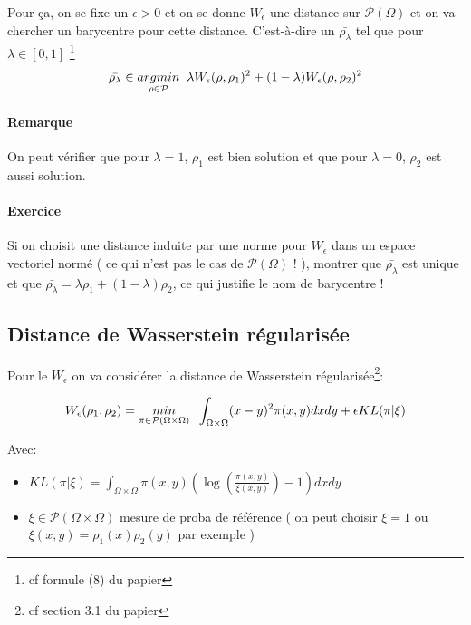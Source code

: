 \documentclass[11pt]{article}
\begin{document}
    Pour ça, on se fixe un $\epsilon > 0$ et on se donne $W_\epsilon$ une distance sur $\mathcal{P}(\Omega)$ et on va chercher un barycentre pour cette distance. C'est-à-dire un  $\bar{\rho_\lambda}$ tel que pour $\lambda \in [0,1]$ \footnote{cf formule (8) du papier}
    \begin{equation}
    \bar{\rho_\lambda} \in \underset{\rho \in \mathcal{P}}{argmin} \hspace{0.2cm} \lambda W_\epsilon(\rho, \rho_1)^2 + (1-\lambda) W_\epsilon(\rho, \rho_2)^2
    \end{equation}
    
    \paragraph{Remarque}
     On peut vérifier que pour $\lambda=1$, $\rho_1$ est bien solution et que pour $\lambda=0$, $\rho_2$ est aussi solution.
    
    \paragraph{Exercice}
    Si on choisit une distance induite par une norme pour $W_\epsilon$ dans un espace vectoriel normé ( ce qui n'est pas le cas de $\mathcal{P}(\Omega)$ ! ), montrer que $\bar{\rho_\lambda}$ est unique et que $\bar{\rho_\lambda} = \lambda \rho_1 + (1-\lambda) \rho_2$, ce qui justifie le nom de barycentre !
    
    \newpage
    \subsection{Distance de Wasserstein régularisée}
    
    Pour le $W_\epsilon$ on va considérer la distance de Wasserstein régularisée\footnote{cf section 3.1 du papier}:
    
    \begin{equation}
    W_\epsilon(\rho_1, \rho_2) = \underset{\pi \in \mathcal{P}(\Omega \times \Omega )}{min} \hspace{0.2cm} \int_{\Omega \times \Omega} (x-y)^2 \pi(x,y) dx dy + \epsilon KL(\pi | \xi )
    \end{equation}
    
    Avec:
    \begin{itemize}
    \item $KL(\pi | \xi ) = \int_{\Omega \times \Omega} \pi(x,y) (\log (\frac{\pi(x,y)}{\xi(x,y)}) -1) dx dy$
    \item $\xi \in \mathcal{P}(\Omega \times \Omega )$ mesure de proba de référence ( on peut choisir $\xi=1$ ou $\xi(x,y)= \rho_1(x) \rho_2(y)$ par exemple )
    \end{itemize}
     
\end{document}
